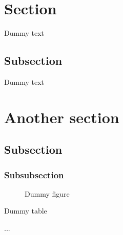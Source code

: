 \documentclass{article}
\begin{document}
\doublespacing
\tableofcontents
\singleplacing
\newpage

\section{Section}

Dummy text

\subsection{Subsection}

Dummy text

\section{Another section}
\subsection{Subsection}
\subsubsection{Subsubsection}

\begin{figure}
  \caption{Dummy figure}
\end{figure}

\begin{table}
  \caption{Dummy table}
\end{table}
...
\begin{appendix}
  \listoffigures
  \listoftables
\end{appendix}
\end{document}
